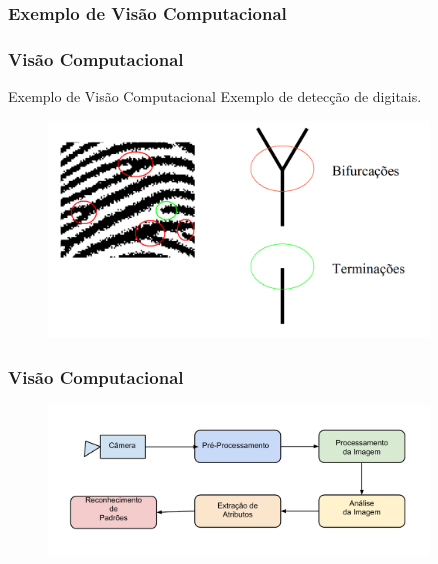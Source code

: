 \documentclass{beamer}
\begin{document}
\subsubsection{Exemplo de Visão Computacional}
\begin{frame}
\frametitle{Visão Computacional}
	\begin{block}{Exemplo de Visão Computacional}
		Exemplo de detecção de digitais.
	\end{block}
	\begin{figure}[!h]
		\begin{center}
			\includegraphics[width=0.9\textwidth]{Figures/bifdigitais}
		\end{center}
		
	\end{figure}
	
\end{frame}



\begin{frame}
\frametitle{Visão Computacional}

	\begin{figure}[!h]
		\begin{center}
			\includegraphics[width=0.9\textwidth]{Figures/ProcessosVC}
		\end{center}
		
	\end{figure}
	
\end{frame}
\end{document}

